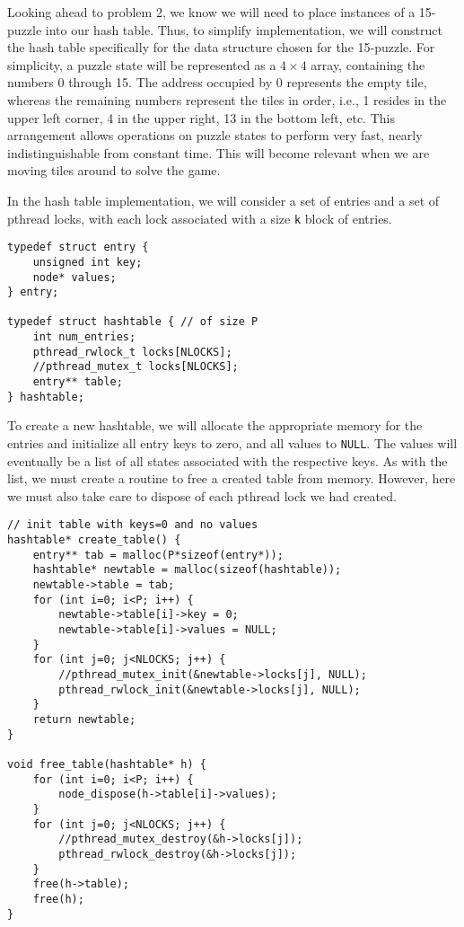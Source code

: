 \documentclass[11pt]{article}
\begin{document}
Looking ahead to problem 2, we know we will need to place instances of
a 15-puzzle into our hash table. Thus, to simplify implementation, we
will construct the hash table specifically for the data structure
chosen for the 15-puzzle. For simplicity, a puzzle state will be
represented as a $4 \times 4$ array, containing the numbers 0
through 15. The address occupied by 0 represents the empty tile,
whereas the remaining numbers represent the tiles in order, i.e., 1
resides in the upper left corner, 4 in the upper right, 13 in the
bottom left, etc. This arrangement allows operations on puzzle states
to perform very fast, nearly indistinguishable from constant
time. This will become relevant when we are moving tiles around to
solve the game. 

In the hash table implementation, we will consider a set of entries
and a set of pthread locks, with each lock associated with a size \verb~k~
block of entries.

\begin{verbatim}
typedef struct entry {
    unsigned int key;
    node* values;
} entry;

typedef struct hashtable { // of size P
    int num_entries;
    pthread_rwlock_t locks[NLOCKS];
    //pthread_mutex_t locks[NLOCKS];
    entry** table;
} hashtable;
\end{verbatim}

To create a new hashtable, we will allocate the appropriate memory for
the entries and initialize all entry keys to zero, and all values to
\verb~NULL~. The values will eventually be a list of all states associated
with the respective keys. As with the list, we must create a routine
to free a created table from memory. However, here we must also take
care to dispose of each pthread lock we had created.

\begin{verbatim}
// init table with keys=0 and no values
hashtable* create_table() {
    entry** tab = malloc(P*sizeof(entry*));
    hashtable* newtable = malloc(sizeof(hashtable));
    newtable->table = tab;
    for (int i=0; i<P; i++) {
        newtable->table[i]->key = 0;
        newtable->table[i]->values = NULL;
    }
    for (int j=0; j<NLOCKS; j++) {
        //pthread_mutex_init(&newtable->locks[j], NULL);
        pthread_rwlock_init(&newtable->locks[j], NULL);
    }
    return newtable;
}

void free_table(hashtable* h) {
    for (int i=0; i<P; i++) {
        node_dispose(h->table[i]->values);
    }
    for (int j=0; j<NLOCKS; j++) {
        //pthread_mutex_destroy(&h->locks[j]);
        pthread_rwlock_destroy(&h->locks[j]);
    }
    free(h->table);
    free(h);
}
\end{verbatim}
\end{document}
